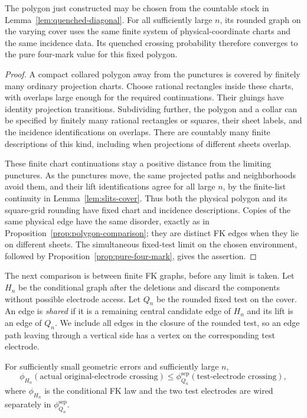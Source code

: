 \begin{lemma}
\label{lem:slits-fixed-test}
The polygon just constructed may be chosen from the countable stock
in Lemma~\ref{lem:quenched-diagonal}.  For all sufficiently large $n$,
its rounded graph on the varying cover uses the same finite system
of physical-coordinate charts and the same incidence data.  Its
quenched crossing probability therefore converges to the pure
four-mark value for this fixed polygon.
\end{lemma}

\begin{proof}
A compact collared polygon away from the punctures is covered by
finitely many ordinary projection charts.  Choose rational rectangles
inside these charts, with overlaps large enough for the required
continuations.  Their gluings have identity projection transitions.
Subdividing further, the polygon and a collar can be specified by
finitely many rational rectangles or squares, their sheet labels,
and the incidence identifications on overlaps.  There are countably
many finite descriptions of this kind, including when projections
of different sheets overlap.

These finite chart continuations stay a positive distance from the
limiting punctures.  As the punctures move, the same projected paths
and neighborhoods avoid them, and their lift identifications agree
for all large $n$, by the finite-list continuity in
Lemma~\ref{lem:slits-cover}.  Thus both the physical polygon and its
square-grid rounding have fixed chart and incidence descriptions.
Copies of the same physical edge have the same disorder, exactly
as in Proposition~\ref{prop:polygon-comparison}; they are distinct
FK edges when they lie on different sheets.  The simultaneous
fixed-test limit on the chosen environment, followed by
Proposition~\ref{prop:pure-four-mark}, gives the assertion.
\end{proof}

The next comparison is between finite FK graphs, before any limit is
taken.  Let $H_n$ be the conditional graph after the deletions and
discard the components without possible electrode access.  Let
$Q_n$ be the rounded fixed test on the cover.  An edge is
\emph{shared} if it is a remaining central candidate edge of $H_n$
and its lift is an edge of $Q_n$.  We include all edges in the closure
of the rounded test, so an edge path leaving through a vertical
side has a vertex on the corresponding test electrode.

\begin{lemma}\label{lem:slits-shared}
For sufficiently small geometric errors and sufficiently large $n$,
\begin{equation}\label{eq:slits-shared-comparison}
 \phi_{H_n}(\text{actual original-electrode crossing})
 \leq
 \phi_{Q_n}^{\mathrm{sep}}(\text{test-electrode crossing}),
\end{equation}
where $\phi_{H_n}$ is the conditional FK law and the two test
electrodes are wired separately in $\phi_{Q_n}^{\mathrm{sep}}$.
\end{lemma}


